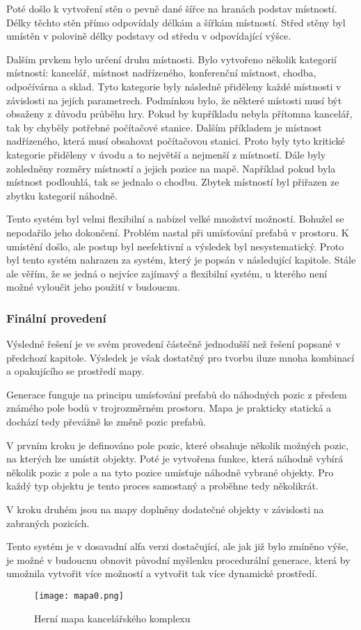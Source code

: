 Poté došlo k vytvoření stěn o pevně dané šířce na hranách podstav místností. Délky těchto stěn přímo odpovídaly délkám a šířkám místností. Střed stěny byl umístěn v polovině délky podstavy od středu v odpovídající výšce.

Dalším prvkem bylo určení druhu místnosti. Bylo vytvořeno několik kategorií místností: kancelář, místnost nadřízeného, konferenční místnost, chodba, odpočívárna a sklad. Tyto kategorie byly následně přiděleny každé místnosti v závislosti na jejích parametrech. Podmínkou bylo, že některé místosti musí být obsaženy z důvodu průběhu hry. Pokud by kupříkladu nebyla přítomna kancelář, tak by chyběly potřebné počítačové stanice. Dalším příkladem je místnost nadřízeného, která musí obsahovat počítačovou stanici. Proto byly tyto kritické kategorie přiděleny v úvodu a to největší a nejmenší z místností. Dále byly zohledněny rozměry místností a jejich pozice na mapě. Například pokud byla místnost podlouhlá, tak se jednalo o chodbu. Zbytek místností byl přiřazen ze zbytku kategorií náhodně.

Tento systém byl velmi flexibilní a nabízel velké množství možností. Bohužel se nepodařilo jeho dokončení. Problém nastal při umísťování prefabů v prostoru. K umístění došlo, ale postup byl neefektivní a výsledek byl nesystematický. Proto byl tento systém nahrazen za systém, který je popsán v následující kapitole. Stále ale věřím, že se jedná o nejvíce zajímavý a flexibilní systém, u kterého není možné vyloučit jeho použití v budoucnu.

\subsubsection{Finální provedení}
\label{sec:finalni_provedeni_mapy}

Výsledné řešení je ve svém provedení částečně jednodušší než řešení popsané v předchozí kapitole. Výsledek je však dostatčný pro tvorbu iluze mnoha kombinací a opakujícího se prostředí mapy.

Generace funguje na principu umísťování prefabů do náhodných pozic z předem známého pole bodů v trojrozměrném prostoru. Mapa je prakticky statická a dochází tedy převážně ke změně pozic prefabů.

V prvním kroku je definováno pole pozic, které obsahuje několik možných pozic, na kterých lze umístit objekty. Poté je vytvořena funkce, která náhodně vybírá několik pozic z pole a na tyto pozice umísťuje náhodně vybrané objekty. Pro každý typ objektu je tento proces samostaný a proběhne tedy několikrát.

V kroku druhém jsou na mapy doplněny dodatečné objekty v závislosti na zabraných pozicích.

Tento systém je v dosavadní alfa verzi dostačující, ale jak již bylo zmíněno výše, je možné v budoucnu obnovit původní myšlenku procedurální generace, která by umožnila vytvořit více možností a vytvořit tak více dynamické prostředí.

\begin{figure}[ht]
    \texttt{[image: mapa0.png]}
    \centering
    \caption{Herní mapa kancelářského komplexu}
    \label{fig:mapa0_img}
\end{figure}
